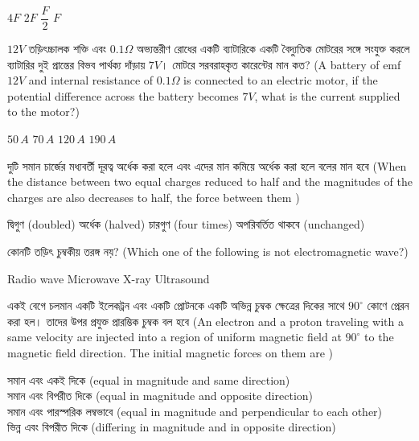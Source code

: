 \documentclass[addpoints]{exam}
\begin{document}
\begin{questions}
\begin{oneparchoices}
\choice $ 4F $
\choice $ 2F $
\choice $ \dfrac{F}{2} $
\choice $ F $
\end{oneparchoices}



\question $ 12 V $ তড়িৎচ্চালক শক্তি এবং $ 0.1\Omega $ অভ্যন্তরীণ রোধের একটি ব্যাটারিকে  একটি বৈদ্যুতিক মোটরের সঙ্গে সংযুক্ত করলে ব্যাটারির দুই প্রান্তের বিভব পার্থক্য দাঁড়ায় $ 7 V $। মোটরে সরবরাহকৃত কারেন্টের মান কত? (A battery of emf $ 12 V $ and internal resistance of $ 0.1\Omega $ is connected to an electric motor, if the potential difference across the battery becomes $ 7 V $, what is the current supplied to the motor?)

\begin{oneparchoices}
\choice $ 50\,A $
\choice $ 70\,A $
\choice $ 120\,A $
\choice $ 190\,A $
\end{oneparchoices}

\question দুটি সমান চার্জের মধ্যবর্তী দূরত্ব অর্ধেক করা হলে এবং এদের মান কমিয়ে অর্ধেক করা হলে বলের মান হবে (When the distance between two equal charges reduced to half and the magnitudes of the charges are also decreases to half, the force between them )


\begin{oneparchoices}
\choice দ্বিগুণ (doubled)
\hspace*{-.4cm}\choice অর্ধেক (halved)
\hspace*{-.4cm}\choice চারগুণ (four times)
\hspace*{-.4cm}\choice অপরিবর্তিত থাকবে (unchanged)
\end{oneparchoices}

\question  কোনটি তড়িৎ চুম্বকীয় তরঙ্গ নয়? (Which one of the following is not electromagnetic wave?)

\begin{oneparchoices}
\choice Radio wave
\choice Microwave
\choice X-ray
\choice Ultrasound
\end{oneparchoices}

\question  একই বেগে চলমান একটি ইলেকট্রন এবং একটি প্রোটনকে একটি অভিন্ন চুম্বক ক্ষেত্রের দিকের সাথে $ 90^{\circ} $ কোণে প্রেরন করা হল। তাদের উপর প্রযুক্ত প্রারম্ভিক চুম্বক বল হবে (An electron and a proton traveling with a same velocity are injected into a region of uniform magnetic field at $ 90^{\circ} $ to the magnetic field direction. The initial magnetic forces on them are )

\begin{oneparchoices}
\choice সমান এবং একই দিকে (equal in magnitude and same direction)\\
\hspace*{-.3cm}\choice সমান এবং বিপরীত দিকে (equal in magnitude and opposite direction)\\
\hspace*{-.3cm}\choice সমান এবং পারস্পরিক লম্বভাবে (equal in magnitude and perpendicular to each other)\\
\hspace*{-.3cm}\choice ভিন্ন এবং বিপরীত দিকে (differing in magnitude and in opposite direction)
\end{oneparchoices}


\end{questions}
\end{document}
